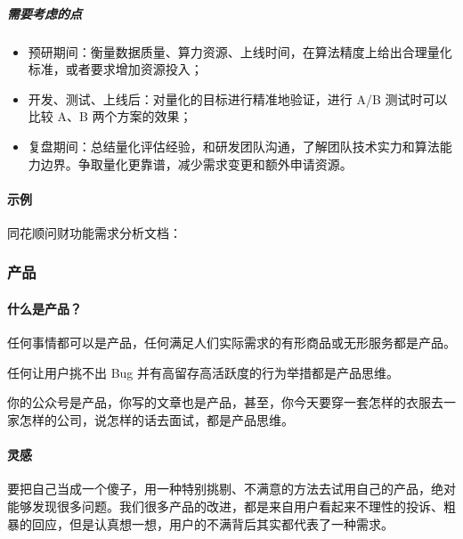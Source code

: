 \documentclass[letterpaper,10pt,english]{sphinxmanual}
\begin{document}
\subparagraph{需要考虑的点}
\label{\detokenize{chapter_introduction/need:id20}}\begin{itemize}
\item {} 
预研期间：衡量数据质量、算力资源、上线时间，在算法精度上给出合理量化标准，或者要求增加资源投入；

\item {} 
开发、测试、上线后：对量化的目标进行精准地验证，进行 A/B
测试时可以比较 A、B 两个方案的效果；

\item {} 
复盘期间：总结量化评估经验，和研发团队沟通，了解团队技术实力和算法能力边界。争取量化更靠谱，减少需求变更和额外申请资源。

\end{itemize}


\paragraph{示例}
\label{\detokenize{chapter_introduction/need:id21}}
同花顺问财功能需求分析文档：


\subsubsection{产品}
\label{\detokenize{chapter_introduction/Product:id1}}\label{\detokenize{chapter_introduction/Product::doc}}

\paragraph{什么是产品？}
\label{\detokenize{chapter_introduction/Product:id2}}
任何事情都可以是产品，任何满足人们实际需求的有形商品或无形服务都是产品。%
\begin{footnote}[37]\sphinxAtStartFootnote
{}
%
\end{footnote}

任何让用户挑不出 Bug 并有高留存高活跃度的行为举措都是产品思维。

你的公众号是产品，你写的文章也是产品，甚至，你今天要穿一套怎样的衣服去一家怎样的公司，说怎样的话去面试，都是产品思维。


\paragraph{灵感}
\label{\detokenize{chapter_introduction/Product:id3}}
要把自己当成一个傻子，用一种特别挑剔、不满意的方法去试用自己的产品，绝对能够发现很多问题。我们很多产品的改进，都是来自用户看起来不理性的投诉、粗暴的回应，但是认真想一想，用户的不满背后其实都代表了一种需求。
%
\begin{footnote}[38]\sphinxAtStartFootnote
{}
%
\end{footnote}
\end{document}
